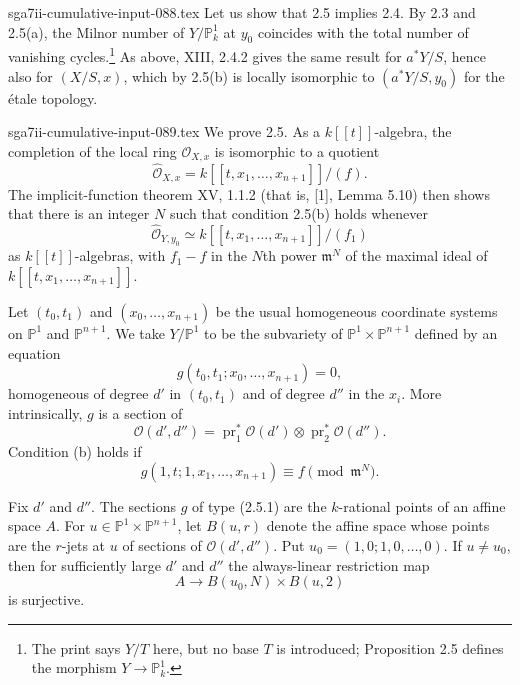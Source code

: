 \begin{filecontents*}{sga7ii-cumulative-input-088.tex}
Let us show that 2.5 implies 2.4.  By 2.3 and 2.5(a), the Milnor
number of $Y/\mathbb P^1_k$ at $y_0$ coincides with the total number
of vanishing cycles.\footnote{The print says $Y/T$ here, but no base
$T$ is introduced; Proposition 2.5 defines the morphism
$Y\to\mathbb P^1_k$.}
As above, XIII, 2.4.2 gives the same result for $a^*Y/S$, hence also
for $(X/S,x)$, which by 2.5(b) is locally isomorphic to
$(a^*Y/S,y_0)$ for the \'etale topology.
\end{filecontents*}
\begin{filecontents*}{sga7ii-cumulative-input-089.tex}
We prove 2.5.  As a $k[[t]]$-algebra, the completion of the local
ring $\mathcal O_{X,x}$ is isomorphic to a quotient
\[
\widehat{\mathcal O}_{X,x}
=k[[t,x_1,\ldots,x_{n+1}]]/(f).
\]
The implicit-function theorem XV, 1.1.2 (that is, [1], Lemma 5.10)
then shows that there is an integer $N$ such that condition 2.5(b)
holds whenever
\[
\widehat{\mathcal O}_{Y,y_0}
\simeq k[[t,x_1,\ldots,x_{n+1}]]/(f_1)
\]
as $k[[t]]$-algebras, with $f_1-f$ in the $N$th power $\mathfrak m^N$
of the maximal ideal of $k[[t,x_1,\ldots,x_{n+1}]]$.

Let $(t_0,t_1)$ and $(x_0,\ldots,x_{n+1})$ be the usual homogeneous
coordinate systems on $\mathbb P^1$ and $\mathbb P^{n+1}$.  We take
$Y/\mathbb P^1$ to be the subvariety of
$\mathbb P^1\times\mathbb P^{n+1}$ defined by an equation
\begin{equation}\tag{2.5.1}
g(t_0,t_1;x_0,\ldots,x_{n+1})=0,
\end{equation}
homogeneous of degree $d'$ in $(t_0,t_1)$ and of degree $d''$ in the
$x_i$.  More intrinsically, $g$ is a section of
\[
\mathcal O(d',d'')=\operatorname{pr}_1^*\mathcal O(d')
\otimes\operatorname{pr}_2^*\mathcal O(d'').
\]
Condition (b) holds if
\begin{equation}\tag{2.5.2}
g(1,t;1,x_1,\ldots,x_{n+1})\equiv f\pmod{\mathfrak m^N}.
\end{equation}

Fix $d'$ and $d''$.  The sections $g$ of type (2.5.1) are the
$k$-rational points of an affine space $A$.  For
$u\in\mathbb P^1\times\mathbb P^{n+1}$, let $B(u,r)$ denote the
affine space whose points are the $r$-jets at $u$ of sections of
$\mathcal O(d',d'')$.  Put
$u_0=(1,0;1,0,\ldots,0)$.  If $u\ne u_0$, then for sufficiently
large $d'$ and $d''$ the always-linear restriction map
\begin{equation}\tag{2.5.3}
A\longrightarrow B(u_0,N)\times B(u,2)
\end{equation}
is surjective.


\end{filecontents*}
